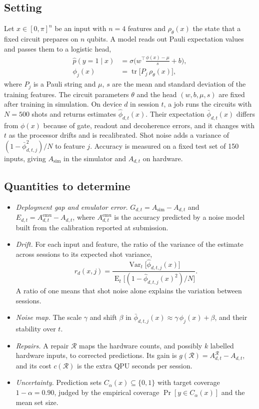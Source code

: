 \documentclass[10pt,conference]{IEEEtran}
\begin{document}
\subsection{Setting}
Let $x\in[0,\pi]^{n}$ be an input with $n=4$ features and $\rho_\theta(x)$ the state
that a fixed circuit prepares on $n$ qubits. A model reads out Pauli expectation values and
passes them to a logistic head,
\begin{align}
\hat p(y=1\mid x)&=\sigma\!\Big(w^\top\frac{\phi(x)-\mu}{s}+b\Big), \label{eq:model}\\
\phi_j(x)&=\operatorname{tr}\!\big[P_j\,\rho_\theta(x)\big], \nonumber
\end{align}
where $P_j$ is a Pauli string and $\mu$, $s$ are the mean and standard deviation of the training
features. The circuit parameters $\theta$ and the head $(w,b,\mu,s)$ are fixed after training in
simulation. On device $d$ in session $t$, a job runs the circuits with $N=500$ shots and
returns estimates $\hat\phi_{d,t}(x)$. Their expectation $\bar\phi_{d,t}(x)$ differs from
$\phi(x)$ because of gate, readout and decoherence errors, and it changes with $t$ as the
processor drifts and is recalibrated. Shot noise adds a variance of
$(1-\bar\phi_{d,t,j}^{2})/N$ to feature $j$. Accuracy is measured on a fixed test set of
150 inputs, giving $A_{\mathrm{sim}}$ in the simulator and $A_{d,t}$ on hardware.

\subsection{Quantities to determine}
\begin{itemize}
\item \emph{Deployment gap and emulator error.} $G_{d,t}=A_{\mathrm{sim}}-A_{d,t}$ and
$E_{d,t}=A^{\mathrm{emu}}_{d,t}-A_{d,t}$, where $A^{\mathrm{emu}}_{d,t}$ is the accuracy
predicted by a noise model built from the calibration reported at submission.
\item \emph{Drift.} For each input and feature, the ratio of the variance of the estimate across
sessions to its expected shot variance,
\begin{equation}
r_d(x,j)=\frac{\operatorname{Var}_t\big[\hat\phi_{d,t,j}(x)\big]}
{\operatorname{E}_t\big[(1-\hat\phi_{d,t,j}(x)^{2})/N\big]}.
\label{eq:drift}
\end{equation}
A ratio of one means that shot noise alone explains the variation between sessions.
\item \emph{Noise map.} The scale $\gamma$ and shift $\beta$ in
$\bar\phi_{d,t,j}(x)\approx\gamma\,\phi_j(x)+\beta$, and their stability over $t$.
\item \emph{Repairs.} A repair $\mathcal R$ maps the hardware counts, and possibly $k$ labelled
hardware inputs, to corrected predictions. Its gain is $g(\mathcal R)=A^{\mathcal R}_{d,t}-
A_{d,t}$, and its cost $c(\mathcal R)$ is the extra QPU seconds per session.
\item \emph{Uncertainty.} Prediction sets $C_\alpha(x)\subseteq\{0,1\}$ with target coverage
$1-\alpha=0.90$, judged by the empirical coverage
$\Pr[y\in C_\alpha(x)]$ and the mean set size.
\end{itemize}
\end{document}

